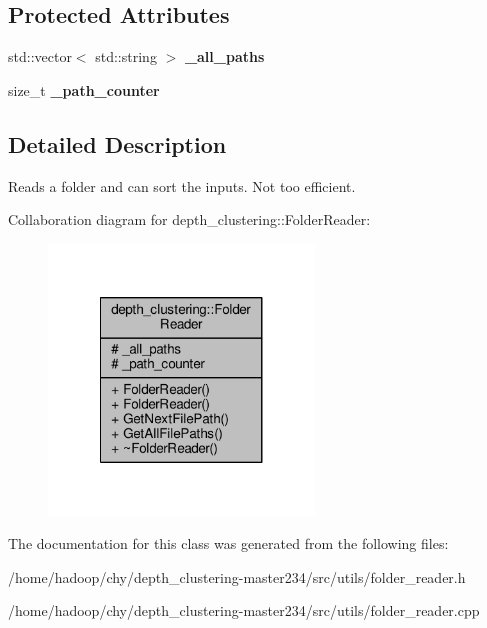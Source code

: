 \subsection*{Protected Attributes}
\begin{DoxyCompactItemize}
\item 
\hypertarget{classdepth__clustering_1_1FolderReader_af9ed4e41e57050d7859cd066eb841792}{std\-::vector$<$ std\-::string $>$ {\bfseries \-\_\-all\-\_\-paths}}\label{classdepth__clustering_1_1FolderReader_af9ed4e41e57050d7859cd066eb841792}

\item 
\hypertarget{classdepth__clustering_1_1FolderReader_aa9fae723281ea00040a803fc15a86d5d}{size\-\_\-t {\bfseries \-\_\-path\-\_\-counter}}\label{classdepth__clustering_1_1FolderReader_aa9fae723281ea00040a803fc15a86d5d}

\end{DoxyCompactItemize}


\subsection{Detailed Description}
Reads a folder and can sort the inputs. Not too efficient. 

Collaboration diagram for depth\-\_\-clustering\-:\-:Folder\-Reader\-:
\nopagebreak
\begin{figure}[H]
\begin{center}
\leavevmode
\includegraphics[width=200pt]{classdepth__clustering_1_1FolderReader__coll__graph}
\end{center}
\end{figure}


The documentation for this class was generated from the following files\-:\begin{DoxyCompactItemize}
\item 
/home/hadoop/chy/depth\-\_\-clustering-\/master234/src/utils/folder\-\_\-reader.\-h\item 
/home/hadoop/chy/depth\-\_\-clustering-\/master234/src/utils/folder\-\_\-reader.\-cpp\end{DoxyCompactItemize}
